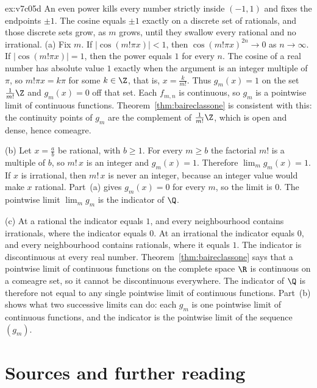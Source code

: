 \begin{solution}{ex:v7c05d}
\idea An even power kills every number strictly inside $(-1,1)$ and fixes the endpoints $\pm1$. The cosine equals $\pm1$ exactly on a discrete set of rationals, and those discrete sets grow, as $m$ grows, until they swallow every rational and no irrational.
\writeup (a) Fix $m$. If $|\cos(m!\pi x)|<1$, then $\cos(m!\pi x)^{2n}\to0$ as $n\to\infty$. If $|\cos(m!\pi x)|=1$, then the power equals $1$ for every $n$. The cosine of a real number has absolute value $1$ exactly when the argument is an integer multiple of $\pi$, so $m!\pi x=k\pi$ for some $k\in\Z$, that is, $x=\frac k{m!}$. Thus $g_m(x)=1$ on the set $\frac1{m!}\Z$ and $g_m(x)=0$ off that set. Each $f_{m,n}$ is continuous, so $g_m$ is a pointwise limit of continuous functions. Theorem~\ref{thm:baireclassone} is consistent with this: the continuity points of $g_m$ are the complement of $\frac1{m!}\Z$, which is open and dense, hence comeagre.

(b) Let $x=\frac ab$ be rational, with $b\ge1$. For every $m\ge b$ the factorial $m!$ is a multiple of $b$, so $m!\,x$ is an integer and $g_m(x)=1$. Therefore $\lim_m g_m(x)=1$. If $x$ is irrational, then $m!\,x$ is never an integer, because an integer value would make $x$ rational. Part~(a) gives $g_m(x)=0$ for every $m$, so the limit is $0$. The pointwise limit $\lim_m g_m$ is the indicator of $\Q$.

(c) At a rational the indicator equals $1$, and every neighbourhood contains irrationals, where the indicator equals $0$. At an irrational the indicator equals $0$, and every neighbourhood contains rationals, where it equals $1$. The indicator is discontinuous at every real number. Theorem~\ref{thm:baireclassone} says that a pointwise limit of continuous functions on the complete space $\R$ is continuous on a comeagre set, so it cannot be discontinuous everywhere. The indicator of $\Q$ is therefore not equal to any single pointwise limit of continuous functions. Part~(b) shows what two successive limits can do: each $g_m$ is one pointwise limit of continuous functions, and the indicator is the pointwise limit of the sequence $(g_m)$.
\end{solution}

\section*{Sources and further reading}

